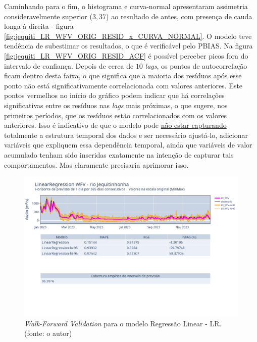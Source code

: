Caminhando para o fim, o histograma e curva-normal apresentaram assimetria consideravelmente superior ($3,37$) ao resultado de antes, com presença de cauda longa à direita - figura \ref{fig:jequiti_LR_WFV_ORIG_RESID_x_CURVA_NORMAL}. O modelo teve tendência de subestimar os resultados, o que é verificável pelo PBIAS. Na figura \ref{fig:jequiti_LR_WFV_ORIG_RESID_ACF} é possível perceber picos fora do intervalo de confiança. Depois de cerca de $10$ \textit{lags}, os pontos de autocorrelação ficam dentro desta faixa, o que significa que a maioria dos resíduos após esse ponto não está significativamente correlacionada com valores anteriores. Este pontos vermelhos no início do gráfico podem indicar que há correlações significativas entre os resíduos nas \textit{lags} mais próximas, o que sugere, nos primeiros períodos, que os resíduos estão correlacionados com os valores anteriores. Isso é indicativo de que o modelo pode \underline{não estar capturando} totalmente a estrutura temporal dos dados e ser necessário ajustá-lo, adicionar variáveis que expliquem essa dependência temporal, ainda que variáveis de valor acumulado tenham sido inseridas exatamente na intenção de capturar tais comportamentos. Mas claramente precisaria aprimorar isso.

\begin{figure}[!h]
	\centering
	\includegraphics[scale=0.33]{Figuras/jequiti/wfv/LR/LR_WFV_ORIG.png}
	\caption{\textit{Walk-Forward Validation} para o modelo Regressão Linear - LR.\\(fonte: o autor)}
	\label{fig:jequiti_LR_WFV_ORIG}
\end{figure}


